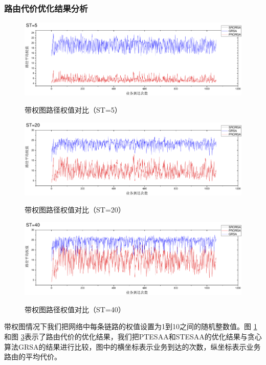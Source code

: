 \subsubsection{路由代价优化结果分析}
\begin{figure}
\setlength{\belowcaptionskip}{-0.5cm}
\begin{center}
{\includegraphics[width=1 \textwidth]{figures/H5C.pdf}}
\end{center}
\caption{{\footnotesize{带权图路径权值对比（ST=5）}}}
\label{H5C}
\end{figure}
\begin{figure}
\setlength{\belowcaptionskip}{-0.5cm}
\begin{center}
{\includegraphics[width=1 \textwidth]{figures/H20C.pdf}}
\end{center}
\caption{{\footnotesize{带权图路径权值对比（ST=20）}}}
\label{H20C}
\end{figure}
\begin{figure}
\setlength{\belowcaptionskip}{-0.5cm}
\begin{center}
{\includegraphics[width=1 \textwidth]{figures/H40C.pdf}}
\end{center}
\caption{{\footnotesize{带权图路径权值对比（ST=40）}}}
\label{H40C}
\end{figure}
带权图情况下我们把网络中每条链路的权值设置为1到10之间的随机整数值。图 \ref{H5C}和图 \ref{H40C}表示了路由代价的优化结果，我们把PTESAA和STESAA的优化结果与贪心算法GRSA的结果进行比较，图中的横坐标表示业务到达的次数，纵坐标表示业务路由的平均代价。

